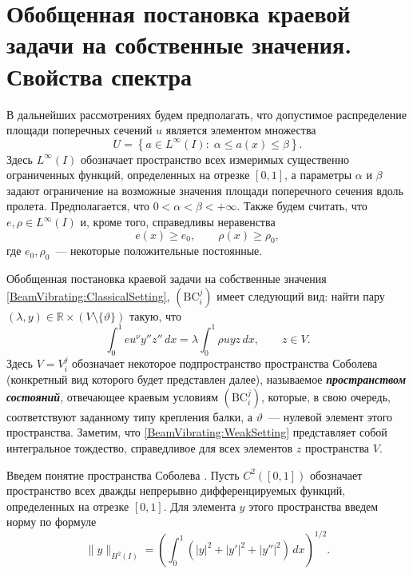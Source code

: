 \section{Обобщенная постановка краевой задачи на собственные значения. Свойства спектра}
\label{section:WeakSetting}

\par
В дальнейших рассмотрениях будем предполагать,
что
допустимое распределение площади поперечных сечений $u$ является элементом 
множества
\[
U = 
\left\{
a \in L^\infty(I) : \;
\alpha \leq a(x) \leq \beta
\right\}.
\]
Здесь $L^\infty(I)$ обозначает пространство всех измеримых существенно ограниченных функций,
определенных на отрезке $[0,1]$,
а параметры $\alpha$ и $\beta$ задают ограничение на возможные значения площади поперечного сечения вдоль пролета.
%
%
%
Предполагается, что
$0 < \alpha < \beta < +\infty$.
%
%
%
Также будем считать,
что
$e, \rho \in L^\infty(I)$ и, кроме того, справедливы неравенства
\[
e(x) \geq e_0,
\qquad
\rho(x) \geq \rho_0,
\]
где $e_0, \rho_0$~--- некоторые положительные постоянные.
%
%
%
\par
Обобщенная постановка краевой задачи на собственные значения
\eqref{BeamVibrating:ClassicalSetting}, $(\mathrm{BC}_i^j)$ имеет следующий вид:
найти пару $(\lambda, y) \in \mathbb{R} \times (V \setminus \{ \vartheta \})$ такую, что
\begin{equation}
\label{BeamVibrating:WeakSetting}
\int_0^1 eu^\nu y'' z'' \, dx
=
\lambda
\int_0^1 \rho u y z \, dx,
\qquad
z \in V.
\end{equation}
%
%
%
Здесь $V = V_i^j$ обозначает некоторое подпространство пространства Соболева
(конкретный вид которого будет представлен далее),
называемое \textbf{\emph{пространством состояний}},
отвечающее краевым условиям $(\mathrm{BC}_i^j)$,
которые, в свою очередь, соответствуют заданному типу крепления балки,
а
$\vartheta$~--- нулевой элемент этого пространства.
%
%
%
Заметим,
что
\eqref{BeamVibrating:WeakSetting} представляет собой интегральное тождество,
справедливое для всех элементов $z$ пространства $V$.
%
%
%
\par
Введем понятие пространства Соболева
\cite{book:OneDimVarProblems}.
%
%
%
Пусть $C^2([0, 1])$ обозначает пространство всех дважды непрерывно дифференцируемых функций,
определенных на отрезке $[0, 1]$.
%
%
%
Для элемента $y$ этого пространства введем норму по формуле
\begin{equation}
\label{SobolevNorm}
\lVert
y
\rVert_{H^2(I)}
=
\left(\int_0^1 \left( |y|^2 + |y'|^2 + |y''|^2 \right) \, dx\right)^{1/2}.
\end{equation}
